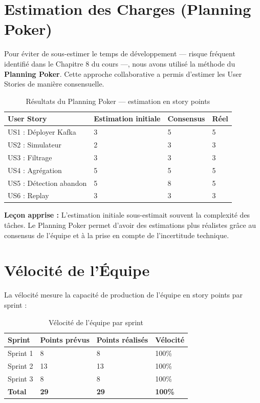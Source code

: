 \section{Estimation des Charges (Planning Poker)}

Pour éviter de sous-estimer le temps de développement --- risque fréquent identifié dans le Chapitre 8 du cours ---, nous avons utilisé la méthode du \textbf{Planning Poker}. Cette approche collaborative a permis d'estimer les User Stories de manière consensuelle.

\begin{table}[H]
\centering
\begin{tabularx}{\textwidth}{X C{2.5cm} C{2.5cm} C{2cm}}
\toprule
\textbf{\color{primarycolor}User Story} &
\textbf{\color{primarycolor}Estimation initiale} &
\textbf{\color{primarycolor}Consensus} &
\textbf{\color{primarycolor}Réel} \\
\midrule
US1 : Déployer Kafka & 3 & 5 & 5 \\
US2 : Simulateur & 2 & 3 & 3 \\
US3 : Filtrage & 3 & 3 & 3 \\
US4 : Agrégation & 5 & 5 & 5 \\
US5 : Détection abandon & 5 & 8 & 5 \\
US6 : Replay & 3 & 3 & 3 \\
\bottomrule
\end{tabularx}
\caption{Résultats du Planning Poker --- estimation en story points}
\end{table}

\begin{infobox}
    \textbf{Leçon apprise :} L'estimation initiale sous-estimait souvent la complexité des tâches. Le Planning Poker permet d'avoir des estimations plus réalistes grâce au consensus de l'équipe et à la prise en compte de l'incertitude technique.
\end{infobox}

\section{Vélocité de l'Équipe}

La vélocité mesure la capacité de production de l'équipe en story points par sprint :

\begin{table}[H]
\centering
\begin{tabularx}{\textwidth}{L{3cm} C{3cm} C{3cm} C{3cm}}
\toprule
\textbf{\color{primarycolor}Sprint} &
\textbf{\color{primarycolor}Points prévus} &
\textbf{\color{primarycolor}Points réalisés} &
\textbf{\color{primarycolor}Vélocité} \\
\midrule
Sprint 1 & 8 & 8 & 100\% \\
Sprint 2 & 13 & 13 & 100\% \\
Sprint 3 & 8 & 8 & 100\% \\
\midrule
\textbf{Total} & \textbf{29} & \textbf{29} & \textbf{100\%} \\
\bottomrule
\end{tabularx}
\caption{Vélocité de l'équipe par sprint}
\end{table}
